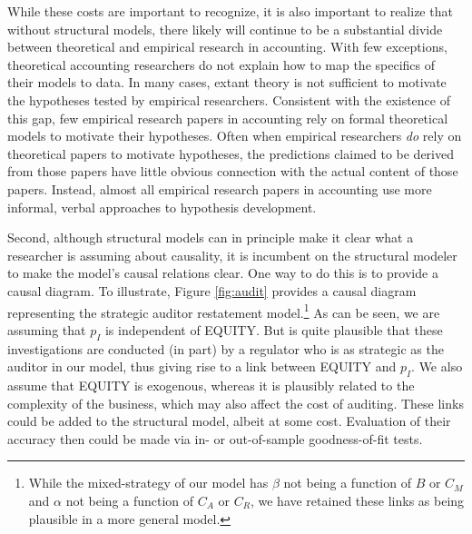 While these costs are important to recognize, it is also important to realize that without structural models, there likely will continue to be a substantial divide between theoretical and empirical research in accounting.
With few exceptions, theoretical accounting researchers do not explain how to map the specifics of their models to data. 
In many cases, extant theory is not sufficient to motivate the hypotheses tested by empirical researchers.
Consistent with the existence of this gap, few empirical research papers in accounting rely on formal theoretical models to motivate their hypotheses. 
Often when empirical researchers \emph{do} rely on theoretical papers to motivate hypotheses, the predictions claimed to be derived from those papers have little obvious connection with the actual content of those papers.
Instead, almost all empirical research papers in accounting use more informal, verbal approaches to hypothesis development.

Second, although structural models can in principle make it clear what a researcher is assuming about causality, it is incumbent on the structural modeler to make the model's causal relations clear.
One way to do this is to provide a causal diagram.
To illustrate, Figure \ref{fig:audit} provides a causal diagram representing the strategic auditor restatement model.\footnote{
While the mixed-strategy of our model has $\beta$ not being a function of $B$ or $C_M$ and $\alpha$ not being a function of $C_A$ or $C_R$, we have retained these links as being plausible in a more general model.}
As can be seen, we are assuming that $p_I$ is independent of EQUITY. 
But is quite plausible that these investigations are conducted (in part) by a regulator who is as strategic as the auditor in our model, thus giving rise to a link between EQUITY and $p_I$.
We also assume that EQUITY is exogenous, whereas it is plausibly related to the complexity of the business, which may also affect the cost of auditing.
These links could be added to the structural model, albeit at some cost.
Evaluation of their accuracy then could be made via in- or out-of-sample goodness-of-fit tests.

